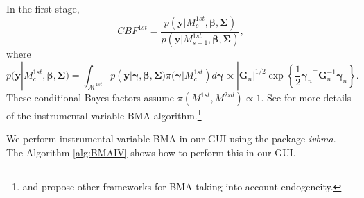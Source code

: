 In the first stage,
\begin{equation*}
	CBF^{1st}=\frac{p(\bm{y}|M_{c}^{1st},\bm{\beta},\bm{\Sigma})}{p(\bm{y}|M_{s-1}^{1st},\bm{\beta},\bm{\Sigma})},
\end{equation*}
where \begin{equation*}
	p(\bm{y}|M_{c}^{1st},\bm{\beta},\bm{\Sigma})=\int_{\mathcal{M}^{1st}}p(\bm{y}|\bm{\gamma},\bm{\beta},\bm{\Sigma})\pi(\bm{\gamma}|M_{c}^{1st})d\bm{\gamma}\propto |\bm{G}_n|^{1/2} \exp\left\{\frac{1}{2}{\bm{\gamma}_n}^{\top}\bm{G}_n^{-1}\bm{\gamma}_n\right\}.
\end{equation*}
These conditional Bayes factors assume $\pi(M^{1st},M^{2sd})\propto 1$. See \cite{Lenkoski2013} for more details of the instrumental variable BMA algorithm.\footnote{\cite{Koop12} and \cite{Lenkoski2014} propose other frameworks for BMA taking into account endogeneity.}

We perform instrumental variable BMA in our GUI using the package \textit{ivbma}. The Algorithm \ref{alg:BMAIV} shows how to perform this in our GUI. 

